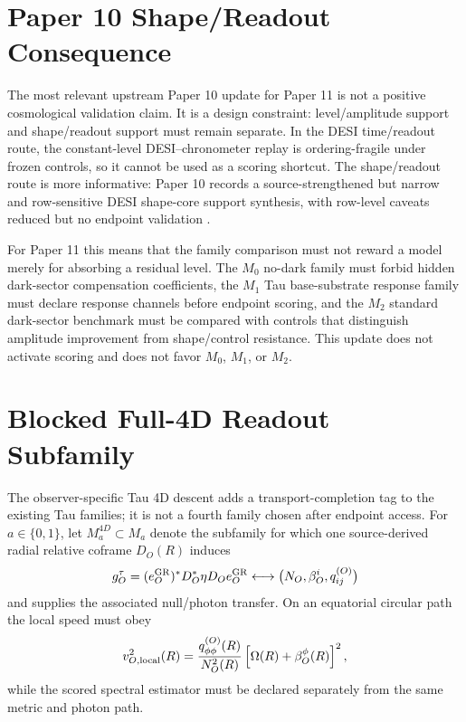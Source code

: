 \documentclass[11pt]{article}
\begin{document}
\section{Paper 10 Shape/Readout Consequence}

The most relevant upstream Paper 10 update for Paper 11 is not a positive
cosmological validation claim. It is a design constraint: level/amplitude
support and shape/readout support must remain separate. In the DESI
time/readout route, the constant-level DESI--chronometer replay is
ordering-fragile under frozen controls, so it cannot be used as a scoring
shortcut. The shape/readout route is more informative: Paper 10 records a
source-strengthened but narrow and row-sensitive DESI shape-core support
synthesis, with row-level caveats reduced but no endpoint validation
\cite{tauCorePaper10}.

For Paper 11 this means that the family comparison must not reward a model
merely for absorbing a residual level. The \(M_0\) no-dark family must forbid
hidden dark-sector compensation coefficients, the \(M_1\) Tau base-substrate
response family must declare response channels before endpoint scoring, and
the \(M_2\) standard dark-sector benchmark must be compared with controls that
distinguish amplitude improvement from shape/control resistance. This update
does not activate scoring and does not favor \(M_0\), \(M_1\), or \(M_2\).

\section{Blocked Full-4D Readout Subfamily}

The observer-specific Tau 4D descent adds a transport-completion tag to the
existing Tau families; it is not a fourth family chosen after endpoint access.
For \(a\in\{0,1\}\), let \(M_a^{4D}\subset M_a\) denote the subfamily for
which one source-derived radial relative coframe \(D_O(R)\) induces
\begin{equation}
 g_O^\tau=(e_O^{\rm GR})^*D_O^*\eta D_Oe_O^{\rm GR}
 \longleftrightarrow
 \bigl(N_O,\beta_O^i,q_{ij}^{(O)}\bigr)
 \label{eq:paper11-full-4d-descent}
\end{equation}
and supplies the associated null/photon transfer.  On an equatorial circular
path the local speed must obey
\begin{equation}
 v_{O,{\rm local}}^2(R)
 =\frac{q_{\phi\phi}^{(O)}(R)}{N_O^2(R)}
 \left[\Omega(R)+\beta_O^\phi(R)\right]^2,
 \label{eq:paper11-full-4d-local-speed}
\end{equation}
while the scored spectral estimator must be declared separately from the same
metric and photon path.
\end{document}
